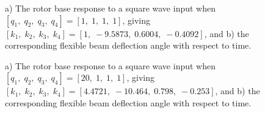 \documentclass[12pt]{report}
\begin{document}
\begin{enumerate}
{\begin{figure}[htb!]
                  \caption{a) The rotor base response to a square wave input when $[q_1,\; q_2,\; q_3,\; q_4] = [1,\; 1,\; 1,\; 1]$, giving $[k_1,\; k_2,\; k_3,\; k_4] = [1,\; -9.5873,\; 0.6004,\; -0.4092]$, and b) the corresponding flexible beam deflection angle with respect to time.}
              \end{figure}
              \begin{figure}[htb!]
                  \caption{a) The rotor base response to a square wave input when $[q_1,\; q_2,\; q_3,\; q_4] = [20,\; 1,\; 1,\; 1]$, giving $[k_1,\; k_2,\; k_3,\; k_4] = [4.4721,\; -10.464,\; 0.798,\; -0.253]$, and b) the corresponding flexible beam deflection angle with respect to time.}
              \end{figure}
              \begin{figure}[htb!]

\end{figure}}
\end{enumerate}
\end{document}
